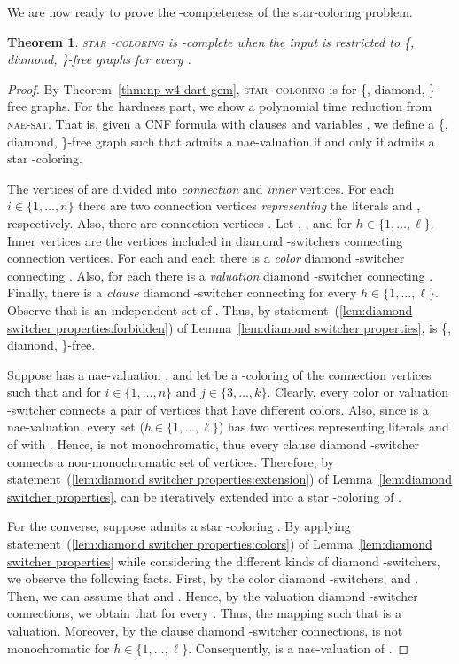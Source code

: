 \documentclass[a4paper, 11pt, oneside]{article}
\newtheorem{theorem}{Theorem}
\newcommand{\stcol}[1]{\textsc{star -coloring}}
\newcommand{\range}[3]{\ensuremath{#1 \in \{#2,\ldots,#3\}}}
\newcommand{\naesat}{\textsc{nae-sat}\xspace}
\let\Definition=\emph
\begin{document}
We are now ready to prove the \NP-completeness of the star-coloring problem.

\begin{theorem}\label{thm:w4dartgemnpc}
\stcol{k} is -complete when the input is restricted to \{, diamond, \}-free graphs for every .
\end{theorem}

\begin{proof}
 By Theorem~\ref{thm:np w4-dart-gem}, \stcol{k} is \NP for \{, diamond, \}-free graphs.  For the hardness part, we show a polynomial time reduction from \naesat.  That is, given a CNF formula  with  clauses  and  variables , we define a \{, diamond, \}-free graph  such that  admits a nae-valuation if and only if  admits a star -coloring.  

 The vertices of  are divided into \Definition{connection} and \Definition{inner} vertices.  For each \range{i}{1}{n} there are two connection vertices  \Definition{representing} the literals  and , respectively.  Also, there are  connection vertices .  Let , , and  for \range{h}{1}{\ell}.  Inner vertices are the vertices included in diamond -switchers connecting connection vertices.  For each  and each  there is a \Definition{color} diamond -switcher connecting .  Also, for each  there is a \Definition{valuation} diamond -switcher connecting .  Finally, there is a \Definition{clause} diamond -switcher connecting  for every \range{h}{1}{\ell}.  Observe that  is an independent set of .  Thus, by statement~(\ref{lem:diamond switcher properties:forbidden}) of Lemma~\ref{lem:diamond switcher properties},  is \{, diamond, \}-free.  

 Suppose  has a nae-valuation , and let  be a -coloring of the connection vertices such that  and  for \range{i}{1}{n} and \range{j}{3}{k}.  Clearly, every color or valuation -switcher connects a pair of vertices that have different colors.  Also, since  is a nae-valuation, every set  (\range{h}{1}{\ell}) has two vertices representing literals  and  of  with .  Hence,  is not monochromatic, thus every clause diamond -switcher connects a non-monochromatic set of vertices.  Therefore, by statement~(\ref{lem:diamond switcher properties:extension}) of Lemma~\ref{lem:diamond switcher properties},  can be iteratively extended into a star -coloring of .

 For the converse, suppose  admits a star -coloring .  By applying statement~(\ref{lem:diamond switcher properties:colors}) of Lemma~\ref{lem:diamond switcher properties} while considering the different kinds of diamond -switchers, we observe the following facts.  First, by the color diamond -switchers,  and .  Then, we can assume that  and .  Hence, by the valuation diamond -switcher connections, we obtain that  for every .  Thus, the mapping  such that  is a valuation.  Moreover, by the clause diamond -switcher connections,  is not monochromatic for \range{h}{1}{\ell}.  Consequently,  is a nae-valuation of .
\end{proof}
\end{document}

